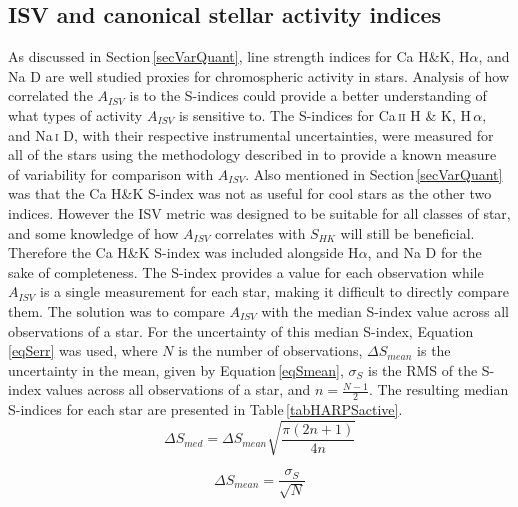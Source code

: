 \subsection{ISV and canonical stellar activity indices}
\label{secOtherInd}
As discussed in Section\,\ref{secVarQuant}, line strength indices for Ca H\&K, H$\alpha$, and Na D are well studied proxies for chromospheric activity in stars. Analysis of how correlated the $A_{ISV}$ is to the S-indices could provide a better understanding of what types of activity $A_{ISV}$ is sensitive to. The S-indices for Ca\,\textsc{ii} H \& K, H\,\textsc{$\alpha$}, and Na\,\textsc{i} D, with their respective instrumental uncertainties, were measured for all of the stars using the methodology described in \citet{2011Gomes} to provide a known measure of variability for comparison with $A_{ISV}$. Also mentioned in Section\,\ref{secVarQuant} was that the Ca H\&K S-index was not as useful for cool stars as the other two indices. However the ISV metric was designed to be suitable for all classes of star, and some knowledge of how $A_{ISV}$ correlates with $S_{HK}$ will still be beneficial. Therefore the Ca H\&K S-index was included alongside H$\alpha$, and Na D for the sake of completeness. The S-index provides a value for each observation while $A_{ISV}$ is a single measurement for each star, making it difficult to directly compare them. The solution was to compare $A_{ISV}$ with the median S-index value across all observations of a star. For the uncertainty of this median S-index, Equation\,\ref{eqSerr} was used, where $N$ is the number of observations, $\Delta S_{mean}$ is the uncertainty in the mean, given by Equation\,\ref{eqSmean}, $\sigma_{S}$ is the RMS of the S-index values across all observations of a star, and $n = \frac{N-1}{2}$. The resulting median S-indices for each star are presented in Table\,\ref{tabHARPSactive}.\\

\begin{equation}
    \Delta S_{med} = \Delta S_{mean}\sqrt{\frac{\pi(2n+1)}{4n}}
    \label{eqSerr}
\end{equation}

\begin{equation}
    \Delta S_{mean} = \frac{\sigma_{S}}{\sqrt{N}}
    \label{eqSmean}
\end{equation}

